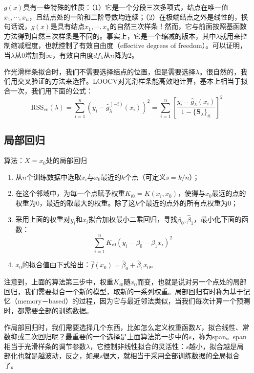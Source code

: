 \documentclass[hyperref,]{ctexart}
\providecommand{\tightlist}{%
  \setlength{\itemsep}{0pt}\setlength{\parskip}{0pt}}
\begin{document}
\(g(x)\)具有一些特殊的性质：（1）它是一个分段三次多项式，结点在唯一值\(x_1,\cdots,x_n\)，且结点处的一阶和二阶导数均连续；（2）在极端结点之外是线性的，换句话说，\(g(x)\)是具有结点\(x_1,\cdots,x_n\)的自然三次样条！然而，它与前面按照基函数方法得到自然三次样条是不同的。事实上，它是一个缩减的版本，其中\(\lambda\)就用来控制缩减程度，也就控制了有效自由度（effective
degrees of
freedom）。可以证明，当\(\lambda\)从0增加到\(\infty\)，有效自由度\(df_\lambda\)从\(n\)降为2。

作光滑样条拟合时，我们不需要选择结点的位置，但是需要选择\(\lambda\)。很自然的，我们用交叉验证的方法来选择。LOOCV对光滑样条能高效地计算，基本上相当于拟合一次，我们用下面的公式：
\[\mathrm{RSS}_{cv}(\lambda)=\sum_{i=1}^n\left(y_i-\hat{g}_\lambda^{(-i)}(x_i)\right)^2=\sum_{i=1}^n\left[\frac{y_i-\hat{g}_\lambda(x_i)}{1-\{\mathbf{S}_\lambda\}_{ii}}\right]^2\]

\subsection{局部回归}

算法：\(X=x_0\)处的局部回归

\begin{enumerate}
\def\labelenumi{\arabic{enumi}.}
\tightlist
\item
  从\(n\)个训练数据中选取\(x_i\)与\(x_0\)最近的\(k\)个点（可定义\(s=k/n\)）；
\item
  在这个邻域中，为每一个点赋予权重\(K_{i0}=K(x_i,x_0)\)，使得与\(x_0\)最远的点的权重为0，最近的取最大的权重。除了这\(k\)个最近的点外的所有点权重为0；
\item
  采用上面的权重对\(y_i\)和\(x_i\)拟合加权最小二乘回归，寻找\(\hat{\beta}_0,\hat{\beta}_1\)，最小化下面的函数：
  \[\sum_{i=1}^n K_{i0}(y_i-\beta_0-\beta_1x_i)^2\]
\item
  \(x_0\)的拟合值由下式给出：\(\hat{f}(x_0)=\hat{\beta}_0+\hat{\beta}_1x_0\)。
\end{enumerate}

注意到，上面的算法第三步中，权重\(K_{i0}\)随\(x_0\)而变，也就是说对另一个点处的局部回归，我们需要拟合一个新的模型，取新的一系列权重。局部回归有时称为基于记忆（memory－based）的过程，因为它与最近邻法类似，当我们每次计算一个预测时，都需要全部的训练数据。

作局部回归时，我们需要选择几个东西，比如怎么定义权重函数\(K\)，拟合线性、常数抑或二次回归呢？最重要的一个选择是上面算法第一步中的\(s\)，称为span。span相当于光滑样条的调节参数\(\lambda\)，它控制非线性拟合的灵活性：\(s\)越小，拟合越是局部化也就是越波动，反之，如果\(s\)很大，就相当于采用全部训练数据的全局拟合了。
\end{document}
